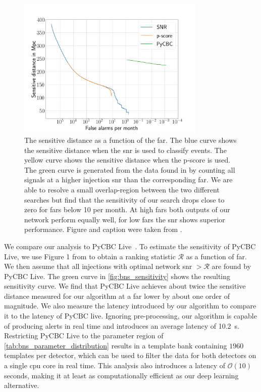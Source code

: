 \begin{figure}
	\centering
	\includegraphics[width=0.8\textwidth]{chapters/bnsnet/images/SensitivitySNR}
	\caption[Sensitivity]{The sensitive distance as a function of the \acrshort{far}. The blue curve shows the sensitive distance when the \acrshort{snr} is used to classify events. The yellow curve shows the sensitive distance when the p-score is used. The green curve is generated from the data found in \cite{Nitz:2017svb} by counting all signals at a higher injection \acrshort{snr} than the corresponding \acrshort{far}. We are able to resolve a small overlap-region between the two different searches but find that the sensitivity of our search drops close to zero for \acrshort{far}s below 10 per month. At high \acrshort{far}s both outputs of our network perform equally well, for low \acrshort{far}s the \acrshort{snr} shows superior performance. Figure and caption were taken from \cite{Schafer:2020kor}.}\label{fig:bns_sensitivity}
\end{figure}

We compare our analysis to PyCBC Live~\cite{Nitz:2018rgo}. To estimate the sensitivity of PyCBC Live, we use Figure 1 from \cite{Nitz:2017svb} to obtain a ranking statistic $\mathcal{R}$ as a function of \acrshort{far}. We then assume that all injections with optimal network \acrshort{snr} $> \mathcal{R}$ are found by PyCBC Live. The green curve in \autoref{fig:bns_sensitivity} shows the resulting sensitivity curve. We find that PyCBC Live achieves about twice the sensitive distance measured for our algorithm at a \acrshort{far} lower by about one order of magnitude. We also measure the latency introduced by our algorithm to compare it to the latency of PyCBC live. Ignoring pre-processing, our algorithm is capable of producing alerts in real time and introduces an average latency of \SI{10.2}{\second}. Restricting PyCBC Live to the parameter region of \autoref{tab:bns_parameter_distribution} results in a template bank containing $1960$ templates per detector, which can be used to filter the data for both detectors on a single \acrshort{cpu} core in real time. This analysis also introduces a latency of $\mathcal{O}(10)$ seconds, making it at least as computationally efficient as our deep learning alternative.

